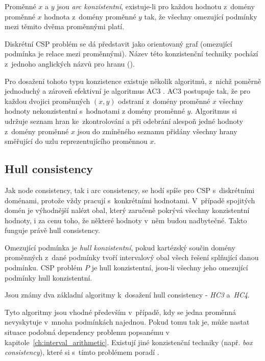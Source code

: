 \begin{definition}
\label{def:arcConsistency}
Proměnné $x$ a $y$ jsou \emph{arc konzistentní}, existuje-li pro každou hodnotu z~domény proměnné $x$ hodnota z~domény proměnné $y$ tak, že všechny omezující podmínky mezi těmito dvěma proměnnými platí.
\end{definition}

Diskrétní CSP problém se dá představit jako orientovaný graf (omezující podmínka je relace mezi proměnnými). Název této konzistenční techniky pochází z~jednoho anglických názvů pro hranu ().

Pro dosažení tohoto typu konzistence existuje několik algoritmů, z~nichž poměrně jednoduchý a zároveň efektivní je algoritmus AC3 \cite{bartakGuide}. AC3 postupuje tak, že pro každou dvojici proměnných $(x, y)$ odstraní z~domény proměnné $x$ všechny hodnoty nekonzistentní s~hodnotami z domény proměnné $y$. Algoritmus si udržuje seznam hran ke~zkontrolování a při odebrání alespoň jedné hodnoty z~domény proměnné $x$ jsou do zmíněného seznamu přidány všechny hrany směřující do uzlu reprezentujícího proměnnou $x$.






\subsection{Hull consistency}

Jak node consistency, tak i arc consistency, se hodí spíše pro CSP s~diskrétními doménami, protože vždy pracují s~konkrétními hodnotami. V~případě spojitých domén je výhodnější nalézt obal, který zaručeně pokrývá všechny konzistentní hodnoty, i za cenu toho, že některé hodnoty v~něm budou nadbytečné. Takto funguje právě hull consistency.

\begin{definition}
\label{def:hullConsistency}
Omezující podmínka je \emph{hull konzistentní}, pokud kartézský součin domény proměnných z~dané podmínky tvoří intervalový obal všech řešení splňující danou podmínku. CSP problém $P$ je hull konzistentní, jsou-li všechny jeho omezující podmínky hull konzistentní.
\end{definition}

Jsou známy dva základní algoritmy k~dosažení hull consistency - \emph{HC3} a~\emph{HC4}.

Tyto algoritmy jsou vhodné především v~případě, kdy se jedna proměnná nevyskytuje v~mnoha podmínkách najednou. Pokud tomu tak je, může nastat situace podobná dependency problemu popsanému v kapitole~\ref{ch:interval_arithmetic}. Existují jiné konzistenční techniky (např. \emph{box consistency}), které si s~tímto problémem poradí \cite{rueherDependency}.

